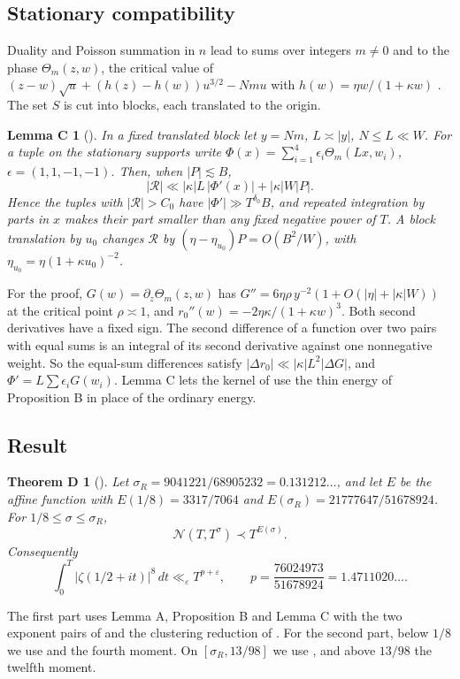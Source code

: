 \documentclass[10pt]{amsart}
\newtheorem*{supportlemma}{Lemma C}
\newtheorem*{resulttheorem}{Theorem D}
\newcommand{\cN}{\mathcal N}
\newcommand{\cR}{\mathcal R}
\begin{document}
\subsection*{Stationary compatibility}
Duality and Poisson summation in $n$ lead to sums over integers $m\ne0$
and to the phase $\Theta_m(z,w)$, the critical value of
$(z-w)\sqrt u+(h(z)-h(w))u^{3/2}-Nmu$ with $h(w)=\eta w/(1+\kappa w)$
\cite[Lemma~\ref*{six-lem:phase}]{Weighted}. The set $S$ is cut into
blocks, each translated to the origin.
\begin{supportlemma}[{\cite[Lemma~\ref*{p-lem:thincompatibility}]{Thin}}]
In a fixed translated block let $y=Nm$, $L\asymp|y|$,
$N\le L\ll W$. For a tuple on the stationary supports write
$\Phi(x)=\sum_{i=1}^4\epsilon_i\Theta_m(Lx,w_i)$, $\epsilon=(1,1,-1,-1)$.
Then, when $|P|\lesssim B$,
\[
 |\cR|\ll|\kappa|L\,|\Phi'(x)|+|\kappa|W|P|.
\]
Hence the tuples with $|\cR|>C_0$ have $|\Phi'|\gg T^{\delta_0}B$, and
repeated integration by parts in $x$ makes their part smaller than any
fixed negative power of $T$. A block translation by $u_0$ changes $\cR$
by $(\eta-\eta_{u_0})P=O(B^2/W)$, with
$\eta_{u_0}=\eta(1+\kappa u_0)^{-2}$.
\end{supportlemma}
For the proof, $G(w)=\partial_z\Theta_m(z,w)$ has
$G''=6\eta\rho\,y^{-2}(1+O(|\eta|+|\kappa|W))$ at the critical point
$\rho\asymp1$, and $r_0''(w)=-2\eta\kappa/(1+\kappa w)^3$. Both second
derivatives have a fixed sign. The second difference of a function over
two pairs with equal sums is an integral of its second derivative
against one nonnegative weight. So the equal-sum differences satisfy
$|\Delta r_0|\ll|\kappa|L^2|\Delta G|$, and $\Phi'=L\sum\epsilon_iG(w_i)$.
Lemma C lets the kernel of \cite{Weighted} use the thin energy of
Proposition B in place of the ordinary energy.

\subsection*{Result}
\begin{resulttheorem}[{\cite[Theorems~\ref*{p-thm:largeeighth}
and~\ref*{p-thm:eighth}]{Thin}}]
Let $\sigma_R=9041221/68905232=0.131212\ldots$, and let $E$ be the
affine function with $E(1/8)=3317/7064$ and
$E(\sigma_R)=21777647/51678924$. For $1/8\le\sigma\le\sigma_R$,
\[
 \cN(T,T^\sigma)\prec T^{E(\sigma)}.
\]
Consequently
\[
 \int_0^T|\zeta(1/2+it)|^8\,dt\ll_\varepsilon T^{p+\varepsilon},\qquad
 p=\frac{76024973}{51678924}=1.4711020\ldots.
\]
\end{resulttheorem}
The first part uses Lemma A, Proposition B and Lemma C with the two
exponent pairs of \cite[Section~1]{Thin} and the clustering reduction of
\cite[Section~4]{Thin}. For the second part, below $1/8$ we use
\cite[Theorem 1.3]{dFP} and the fourth moment. On $[\sigma_R,13/98]$ we
use \cite[Theorem 9.1 with $k=4$]{dFP}, and above $13/98$ the twelfth
moment.
\end{document}
